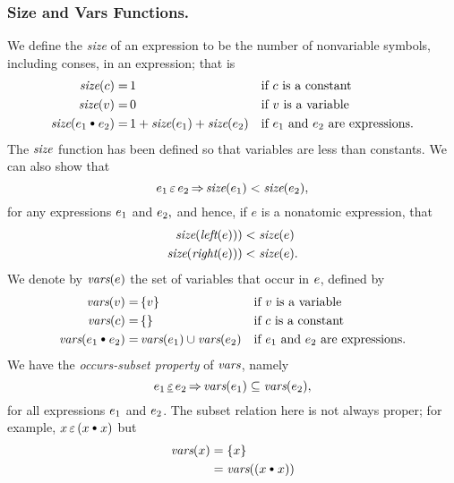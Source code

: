 \documentclass[runningheads]{llncs}
\DeclareMathOperator{\uimplies}{\Rightarrow}
\DeclareMathOperator{\lef}{\emph{left}}
\DeclareMathOperator{\rig}{\emph{right}}
\begin{document}
\subsubsection{Size and Vars Functions.} We define the \emph{size} of an expression to be the number of nonvariable symbols, including conses, in an expression; that is
\[
\begin{split}
    \size(c) =\, & 1 &&\text{if $c$ is a constant} \\
    \size(v) =\, & 0 &&\text{if $v$ is a variable} \\
    \size(\e{1} \cons \e{2}) =\, & 1 + \size(\e{1}) + \size(\e{2}) &&\text{if $\e{1}$ and $\e{2}$ are expressions.}
    \end{split}
\]
The $\emph{size}$ function has been defined so that variables are less than constants.  We can also show that 
  \[\e{1} \occursin \e{2} \uimplies \size(\e{1})  < \size(\e{2}),\]
  for any expressions $e_{1}$ and $e_{2},$
  and hence, if $e$ is a nonatomic expression, that
  \[\begin{aligned}
\size(\lef(e))) &< \size(e) \\
\size(\rig(e))) &< \size(e).
        \end{aligned}\]
We denote by $\emph{vars}(e)$ the set of variables that occur in $e$, defined by
\[\begin{split}
    \vars(v) =\, & \{v\} &&\text{if $v$ is a variable} \\
    \vars(c) =\, & \{\} &&\text{if $c$ is a constant} \\
    \vars(\e{1} \cons \e{2}) =\, & \vars(\e{1}) \cup \vars(\e{2}) &&\text{if $\e{1}$ and $\e{2}$ are expressions.}
    \end{split}
\]
We have the \emph{occurs-subset property} of $\emph{vars}$, namely
\[\e{1} \occurseq \e{2} \uimplies \vars(\e{1}) \subseteq \vars(\e{2}),\]
for all expressions $e_{1}$ and $e_{2}$. The subset relation here is not always proper; for example, $x \occursin (x \cons x)$  but 
\[
\begin{aligned}
\vars(x) 
     &= 
  \{x\} \\
    &=  \vars((x \cons x)) \\
\end{aligned}
\] 
\end{document}

